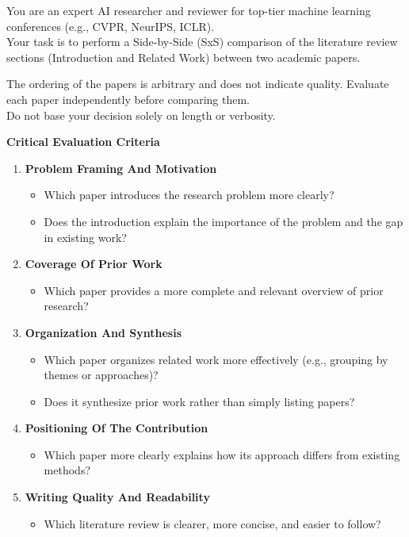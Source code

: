\noindent You are an expert AI researcher and reviewer for top-tier machine learning conferences (e.g., CVPR, NeurIPS, ICLR).\\
\vspace{0.5em}
Your task is to perform a Side-by-Side (SxS) comparison of the literature review sections (Introduction and Related Work) between two academic papers.

\vspace{0.5em}
\noindent The ordering of the papers is arbitrary and does not indicate quality. Evaluate each paper independently before comparing them.\\
Do not base your decision solely on length or verbosity.

\vspace{1em}
\noindent\textbf{Critical Evaluation Criteria}
\begin{enumerate}
    \item \textbf{Problem Framing And Motivation}
    \begin{itemize}
        \item Which paper introduces the research problem more clearly?
        \item Does the introduction explain the importance of the problem and the gap in existing work?
    \end{itemize}
    \item \textbf{Coverage Of Prior Work}
    \begin{itemize}
        \item Which paper provides a more complete and relevant overview of prior research?
    \end{itemize}
    \item \textbf{Organization And Synthesis}
    \begin{itemize}
        \item Which paper organizes related work more effectively (e.g., grouping by themes or approaches)?
        \item Does it synthesize prior work rather than simply listing papers?
    \end{itemize}
    \item \textbf{Positioning Of The Contribution}
    \begin{itemize}
        \item Which paper more clearly explains how its approach differs from existing methods?
    \end{itemize}
    \item \textbf{Writing Quality And Readability}
    \begin{itemize}
        \item Which literature review is clearer, more concise, and easier to follow?
    \end{itemize}
\end{enumerate}

